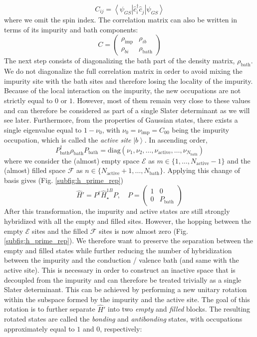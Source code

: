 \documentclass[11pt]{article}
\newcommand{\hamiltonian}{\hat{H}}
\newcommand{\creation}[1]{\hat{c}_{{#1}}^{\dagger}}
\newcommand{\annihilation}[1]{\hat{c}_{{#1}}^{\phantom{\dagger}}}
\newcommand{\ket}[1]{\left| {#1} \right>}
\newcommand{\bra}[1]{\left< {#1} \right|}
\newcommand{\bath}{\text{bath}}
\newcommand{\imp}{\text{imp}}
\newcommand{\activ}{\text{active}}
\begin{document}
\begin{equation}\label{eq:dm}
C_{ij} = \bra{\psi_{GS}}\creation{i}\annihilation{j}\ket{\psi_{GS}}
\end{equation}
where we omit the spin index. The correlation matrix can also be written in terms of its impurity and bath components:
\begin{equation}
C =
\begin{pmatrix}
\rho_{\imp} & \rho_{ib} \\
\rho_{bi} & \rho_{\bath}
\end{pmatrix}
\end{equation}
The next step consists of diagonalizing the bath part of the density matrix, $\rho_{\bath}$. We do not diagonalize the full correlation matrix in order to avoid mixing the impurity site with the bath sites and therefore losing the locality of the impurity.\\
Because of the local interaction on the impurity, the new occupations are not strictly equal to $0$ or $1$. However, most of them remain very close to these values and can therefore be considered as part of a single Slater determinant as we will see later. Furthermore, from the properties of Gaussian states, there exists a single eigenvalue equal to $1-\nu_0$, with $\nu_0=\nu_\imp=C_{00}$ being the impurity occupation, which is called the \textit{active site} $\ket{b}$. In ascending order,
\begin{equation}
P^\dagger_\bath \rho_\bath P_\bath =
\text{diag}(\nu_1, \nu_2, \ldots, \nu_\activ, \ldots, \nu_{N_\bath})
\end{equation}
where we consider the (almost) empty space $\mathcal{E}$ as $m\in \{1,\ldots, N_\activ-1\}$ and the (almost) filled space $\mathcal{F}$ as $n\in \{N_\activ+1,\ldots, N_\bath\}$. Applying this change of basis gives (Fig. \ref{subfig:h_prime_rep})
\begin{equation}\label{eq:bath_rotation}
\hamiltonian' = P^\dagger\hamiltonian_\star^{1B} P, \quad P =
\begin{pmatrix}
1 & 0 \\
0 & P_\bath
\end{pmatrix}
\end{equation}
After this transformation, the impurity and active states are still strongly hybridized with all the empty and filled sites. However, the hopping between the empty $\mathcal{E}$ sites and the filled $\mathcal{F}$ sites is now almost zero (Fig. \ref{subfig:h_prime_rep}). We therefore want to preserve the separation between the empty and filled states while further reducing the number of hybridization between the impurity and the conduction / valence bath (and same with the active site). This is necessary in order to construct an inactive space that is decoupled from the impurity and can therefore be treated trivially as a single Slater determinant. This can be achieved by performing a new unitary rotation within the subspace formed by the impurity and the active site. The goal of this rotation is to further separate $\hamiltonian'$ into two \textit{empty} and \textit{filled} blocks. The resulting rotated states are called the \textit{bonding} and \textit{antibonding} states, with occupations approximately equal to $1$ and $0$, respectively:
\end{document}
